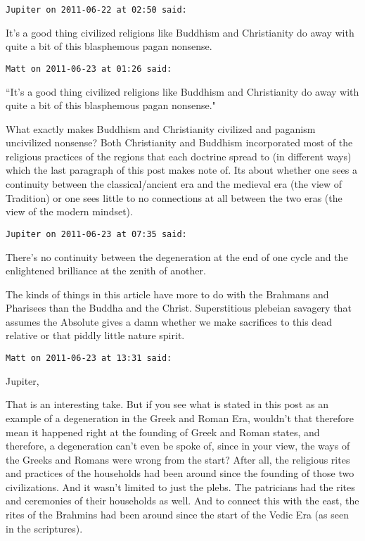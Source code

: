 \begin{footnotesize}\begin{sffamily}



\texttt{Jupiter on 2011-06-22 at 02:50 said: }

It's a good thing civilized religions like Buddhism and Christianity do away with quite a bit of this blasphemous pagan nonsense.


\hfill

\texttt{Matt on 2011-06-23 at 01:26 said: }

``It's a good thing civilized religions like Buddhism and Christianity do away with quite a bit of this blasphemous pagan nonsense."

What exactly makes Buddhism and Christianity civilized and paganism uncivilized nonsense? Both Christianity and Buddhism incorporated most of the religious practices of the regions that each doctrine spread to (in different ways) which the last paragraph of this post makes note of. Its about whether one sees a continuity between the classical/ancient era and the medieval era (the view of Tradition) or one sees little to no connections at all between the two eras (the view of the modern mindset).


\hfill

\texttt{Jupiter on 2011-06-23 at 07:35 said: }

There's no continuity between the degeneration at the end of one cycle and the enlightened brilliance at the zenith of another.

The kinds of things in this article have more to do with the Brahmans and Pharisees than the Buddha and the Christ. Superstitious plebeian savagery that assumes the Absolute gives a damn whether we make sacrifices to this dead relative or that piddly little nature spirit.


\hfill

\texttt{Matt on 2011-06-23 at 13:31 said: }

Jupiter,

That is an interesting take. But if you see what is stated in this post as an example of a degeneration in the Greek and Roman Era, wouldn't that therefore mean it happened right at the founding of Greek and Roman states, and therefore, a degeneration can't even be spoke of, since in your view, the ways of the Greeks and Romans were wrong from the start? After all, the religious rites and practices of the households had been around since the founding of those two civilizations. And it wasn't limited to just the plebs. The patricians had the rites and ceremonies of their households as well. And to connect this with the east, the rites of the Brahmins had been around since the start of the Vedic Era (as seen in the scriptures).


\end{sffamily}
\end{footnotesize}
